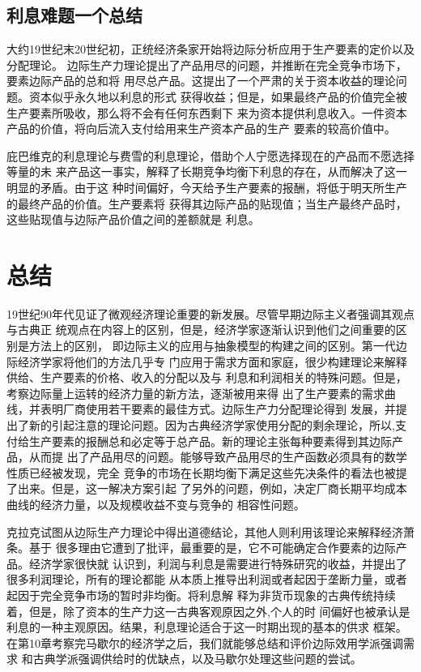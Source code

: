 \subsection{利息难题一个总结}

大约19世纪末20世纪初，正统经济条家开始将边际分析应用于生产要素的定价以及分配理论。
边际生产力理论提出了产品用尽的问题，并推断在完全竞争市场下，要素边际产品的总和将
用尽总产品。这提出了一个严肃的关于资本收益的理论问题。资本似乎永久地以利息的形式
获得收益；但是，如果最终产品的价值完全被生产要素所吸收，那么将不会有任何东西剩下
来为资本提供利息收入。一件资本产品的价值，将向后流入支付给用来生产资本产品的生产
要素的较高价值中。

庇巴维克的利息理论与费雪的利息理论，借助个人宁愿选择现在的产品而不愿选择等量的未
来产品这一事实，解释了长期竞争均衡下利息的存在，从而解决了这一明显的矛盾。由于这
种时间偏好，今天给予生产要素的报酬，将低于明天所生产的最终产品的价值。生产要素将
获得其边际产品的贴现值；当生产最终产品时，这些贴现值与边际产品价值之间的差额就是
利息。

\vspace*{3cm}

\section{总结}

19世纪90年代见证了微观经济理论重要的新发展。尽管早期边际主义者强调其观点与古典正
统观点在内容上的区别，但是，经济学家逐渐认识到他们之间重要的区别是方法上的区别，
即边际主义的应用与抽象模型的构建之间的区别。第一代边际经济学家将他们的方法几乎专
门应用于需求方面和家庭，很少构建理论来解释供给、生产要素的价格、收入的分配以及与
利息和利润相关的特殊问题。但是，考察边际量上运转的经济力量的新方法，逐渐被用来得
出了生产要素的需求曲线，并表明厂商使用若干要素的最佳方式。边际生产力分配理论得到
发展，并提出了新的引起注意的理论问题。因为古典经济学家使用分配的剩余理论，所以,支
付给生产要素的报酬总和必定等于总产品。新的理论主张每种要素得到其边际产品，从而提
出了产品用尽的问题。能够导致产品用尽的生产函数必须具有的数学性质已经被发现，完全
竞争的市场在长期均衡下满足这些先决条件的看法也被提了出来。但是，这一解决方案引起
了另外的问题，例如，决定厂商长期平均成本曲线的经济力量，以及规模收益不变与竞争的
相容性问题。

克拉克试图从边际生产力理论中得出道德结论，其他人则利用该理论来解释经济萧条。基于
很多理由它遭到了批评，最重要的是，它不可能确定合作要素的边际产品。经济学家很快就
认识到，利润与利息是需要进行特殊研究的收益，并提出了很多利润理论，所有的理论都能
从本质上推导出利润或者起因于垄断力量，或者起因于完全竞争市场的暂时非均衡。将利息解
释为非货币现象的古典传统持续着，但是，除了资本的生产力这一古典客观原因之外,个人的时
间偏好也被承认是利息的一种主观原因。结果，利息理论适合于这一时期出现的基本的供求
框架。在第10章考察完马歇尔的经济学之后，我们就能够总结和评价边际效用学派强调需求
和古典学派强调供给时的优缺点，以及马歇尔处理这些问题的尝试。




